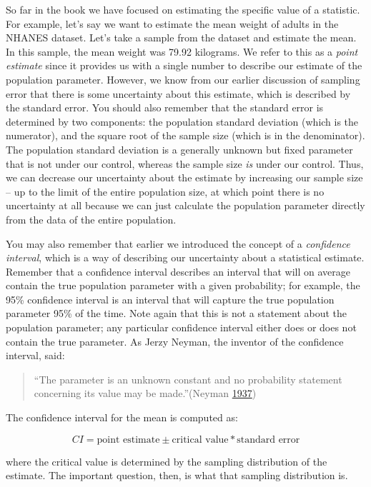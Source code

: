 \documentclass[12pt,]{book}
\theoremstyle{definition}
\theoremstyle{definition}
\theoremstyle{definition}
\theoremstyle{remark}
\begin{document}
So far in the book we have focused on estimating the specific value of a statistic. For example, let's say we want to estimate the mean weight of adults in the NHANES dataset. Let's take a sample from the dataset and estimate the mean. In this sample, the mean weight was 79.92 kilograms. We refer to this as a \emph{point estimate} since it provides us with a single number to describe our estimate of the population parameter. However, we know from our earlier discussion of sampling error that there is some uncertainty about this estimate, which is described by the standard error. You should also remember that the standard error is determined by two components: the population standard deviation (which is the numerator), and the square root of the sample size (which is in the denominator). The population standard deviation is a generally unknown but fixed parameter that is not under our control, whereas the sample size \emph{is} under our control. Thus, we can decrease our uncertainty about the estimate by increasing our sample size -- up to the limit of the entire population size, at which point there is no uncertainty at all because we can just calculate the population parameter directly from the data of the entire population.

You may also remember that earlier we introduced the concept of a \emph{confidence interval}, which is a way of describing our uncertainty about a statistical estimate. Remember that a confidence interval describes an interval that will on average contain the true population parameter with a given probability; for example, the 95\% confidence interval is an interval that will capture the true population parameter 95\% of the time. Note again that this is not a statement about the population parameter; any particular confidence interval either does or does not contain the true parameter. As Jerzy Neyman, the inventor of the confidence interval, said:

\begin{quote}
``The parameter is an unknown constant and no probability statement concerning its value may be made.''(Neyman \protect\hyperlink{ref-Neyman37}{1937})
\end{quote}

The confidence interval for the mean is computed as:

\[
CI = \text{point estimate} \pm \text{critical value} * \text{standard error}
\]

where the critical value is determined by the sampling distribution of the estimate. The important question, then, is what that sampling distribution is.
\end{document}
